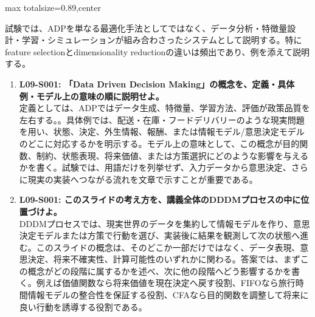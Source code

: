 \begin{minipage}[t]{0.58\textwidth}
\begin{adjustbox}{max totalsize={\textwidth}{0.89\textheight},center}
\begin{minipage}{\textwidth}
試験では、ADPを単なる最適化手法としてではなく、データ分析・特徴量設計・学習・シミュレーションが組み合わさったシステムとして説明する。特にfeature selectionとdimensionality reductionの違いは頻出であり、例を添えて説明する。\par{}\begin{enumerate}\item \textbf{L09-S001: 「Data Driven Decision Making」の概念を、定義・具体例・モデル上の意味の順に説明せよ。}\\定義としては、ADPではデータ生成、特徴量、学習方法、評価が政策品質を左右する。。具体例では、配送・在庫・フードデリバリーのような現実問題を用い、状態、決定、外生情報、報酬、または情報モデル/意思決定モデルのどこに対応するかを明示する。モデル上の意味として、この概念が目的関数、制約、状態表現、将来価値、または方策選択にどのような影響を与えるかを書く。試験では、用語だけを列挙せず、入力データから意思決定、さらに現実の実装へつながる流れを文章で示すことが重要である。\item \textbf{L09-S001: このスライドの考え方を、講義全体のDDDMプロセスの中に位置づけよ。}\\DDDMプロセスでは、現実世界のデータを集約して情報モデルを作り、意思決定モデルまたは方策で行動を選び、実装後に結果を観測して次の状態へ進む。このスライドの概念は、そのどこか一部だけではなく、データ表現、意思決定、将来不確実性、計算可能性のいずれかに関わる。答案では、まずこの概念がどの段階に属するかを述べ、次に他の段階へどう影響するかを書く。例えば価値関数なら将来価値を現在決定へ戻す役割、FIFOなら旅行時間情報モデルの整合性を保証する役割、CFAなら目的関数を調整して将来に良い行動を誘導する役割である。\end{enumerate}
\end{minipage}
\end{adjustbox}
\end{minipage}


